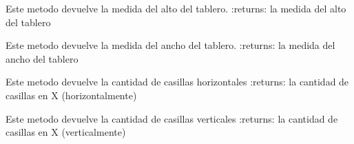 \documentclass[letterpaper,10pt,english]{sphinxmanual}
\begin{document}
\begin{fulllineitems}

\begin{fulllineitems}
\label{\detokenize{codigo:singleton.Singleton.getAlto}}
Este metodo devuelve la medida del alto del tablero.
:returns: la medida del alto del tablero

\end{fulllineitems}


\begin{fulllineitems}
\label{\detokenize{codigo:singleton.Singleton.getAncho}}
Este metodo devuelve la medida del ancho del tablero.
:returns: la medida del ancho del tablero

\end{fulllineitems}


\begin{fulllineitems}
\label{\detokenize{codigo:singleton.Singleton.getCantX}}
Este metodo devuelve la cantidad de casillas horizontales
:returns: la cantidad de casillas en X (horizontalmente)

\end{fulllineitems}


\begin{fulllineitems}
\label{\detokenize{codigo:singleton.Singleton.getCantY}}
Este metodo devuelve la cantidad de casillas verticales
:returns: la cantidad de casillas en X (verticalmente)

\end{fulllineitems}


\end{fulllineitems}
\end{document}
